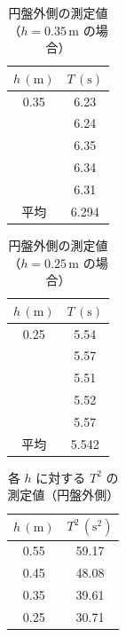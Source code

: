\documentclass{jlreq}
\begin{document}
\begin{table}[htbp]
  \centering
  \caption{円盤外側の測定値（$h=0.35\,\mathrm{m}$ の場合）}
  \renewcommand{\arraystretch}{1.2} %
  \setlength{\tabcolsep}{6pt}       %
  \begin{tabular}{|c|c|}
    \hline
    \textbf{$h\,(\mathrm{m})$} & \textbf{$T\,(\mathrm{s})$} \\ \hline
    0.35 & 6.23 \\ \hline
         & 6.24 \\ \hline
         & 6.35 \\ \hline
         & 6.34 \\ \hline
         & 6.31 \\ \hline
    平均 & 6.294 \\ \hline
  \end{tabular}
  \label{tab:disk_outer_0.35}
\end{table}





\begin{table}[htbp]
  \centering
  \caption{円盤外側の測定値（$h=0.25\,\mathrm{m}$ の場合）}
  \renewcommand{\arraystretch}{1.2} %
  \setlength{\tabcolsep}{6pt}       %
  \begin{tabular}{|c|c|}
    \hline
    \textbf{$h\,(\mathrm{m})$} & \textbf{$T\,(\mathrm{s})$} \\ \hline
    0.25 & 5.54 \\ \hline
         & 5.57 \\ \hline
         & 5.51 \\ \hline
         & 5.52 \\ \hline
         & 5.57 \\ \hline
    平均 & 5.542 \\ \hline
  \end{tabular}
  \label{tab:disk_outer_0.25}
\end{table}




\begin{table}[htbp]
  \centering
  \caption{各 $h$ に対する $T^2$ の測定値（円盤外側）}
  \renewcommand{\arraystretch}{1.2} %
  \setlength{\tabcolsep}{6pt}       %
  \begin{tabular}{|c|c|}
    \hline
    \textbf{$h\,(\mathrm{m})$} & \textbf{$T^2\,(\mathrm{s^2})$} \\ \hline
    0.55 & 59.17 \\ \hline
    0.45 & 48.08 \\ \hline
    0.35 & 39.61 \\ \hline
    0.25 & 30.71 \\ \hline
  \end{tabular}
  \label{tab:disk_outer_T2}
\end{table}
\end{document}
